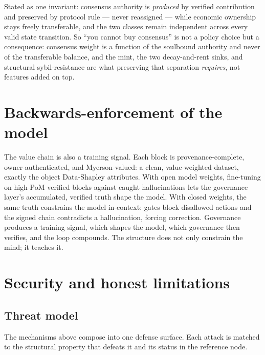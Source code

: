 \documentclass[10pt]{article}
\begin{document}
Stated as one invariant: consensus authority is \emph{produced} by verified contribution and preserved
by protocol rule --- never reassigned --- while economic ownership stays freely transferable, and the
two classes remain independent across every valid state transition. So ``you cannot buy consensus'' is
not a policy choice but a consequence: consensus weight is a function of the soulbound authority and
never of the transferable balance, and the mint, the two decay-and-rent sinks, and structural
sybil-resistance are what preserving that separation \emph{requires}, not features added on top.

\section{Backwards-enforcement of the model}\label{sec:backwards}

The value chain is also a training signal. Each block is provenance-complete, owner-authenticated, and
Myerson-valued: a clean, value-weighted dataset, exactly the object Data-Shapley attributes. With open
model weights, fine-tuning on high-PoM verified blocks against caught hallucinations lets the
governance layer's accumulated, verified truth shape the model. With closed weights, the same truth
constrains the model in-context: gates block disallowed actions and the signed chain contradicts a
hallucination, forcing correction. Governance produces a training signal, which shapes the model,
which governance then verifies, and the loop compounds. The structure does not only constrain the
mind; it teaches it.

\section{Security and honest limitations}\label{sec:security}

\subsection{Threat model}

The mechanisms above compose into one defense surface. Each attack is matched to the structural property
that defeats it and its status in the reference node.
\end{document}
